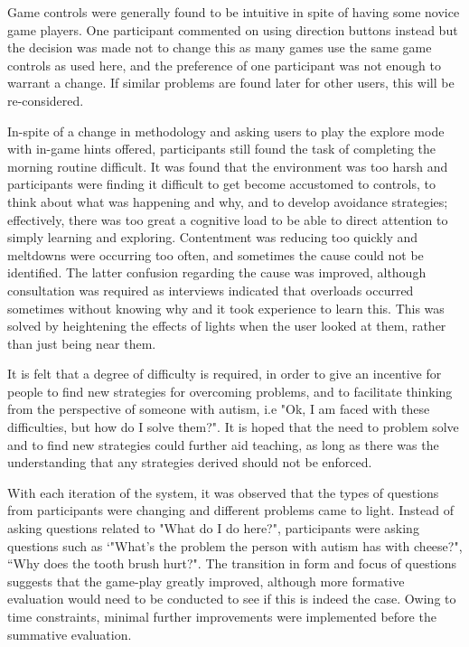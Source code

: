 \documentclass[11pt]{report}
\begin{document}
Game controls were generally found to be intuitive in spite of having some novice game players. One participant commented on using direction buttons instead but the decision was made not to change this as many games use the same game controls as used here, and the preference of one participant was not enough to warrant a change. If similar problems are found later for other users, this will be re-considered. 

In-spite of a change in methodology and asking users to play the explore mode with in-game hints offered, participants still found the task of completing the morning routine difficult. It was found that the environment was too harsh and participants were finding it difficult to get become accustomed to controls, to think about what was happening and why, and to develop avoidance strategies; effectively, there was too great a cognitive load to be able to direct attention to simply learning and exploring. Contentment was reducing too quickly and meltdowns were occurring too often, and sometimes the cause could not be identified. The latter confusion regarding the cause was improved, although consultation was required as interviews indicated that overloads occurred sometimes without knowing why and it took experience to learn this. This was solved by heightening the effects of lights when the user looked at them, rather than just being near them.

It is felt that a degree of difficulty is required, in order to give an incentive for people to find new strategies for overcoming problems, and to facilitate thinking from the perspective of someone with autism, i.e "Ok, I am faced with these difficulties, but how do I solve them?". It is hoped that the need to problem solve and to find new strategies could further aid teaching, as long as there was the understanding that any strategies derived should not be enforced. 

With each iteration of the system, it was observed that the types of questions from participants were changing and different problems came to light. Instead of asking questions related to "What do I do here?", participants were asking questions such as `"What's the problem the person with autism has with cheese?", ``Why does the tooth brush hurt?". The transition in form and focus of questions suggests that the game-play greatly improved, although more formative evaluation would need to be conducted to see if this is indeed the case. Owing to time constraints, minimal further improvements were implemented before the summative evaluation. 
\end{document}
